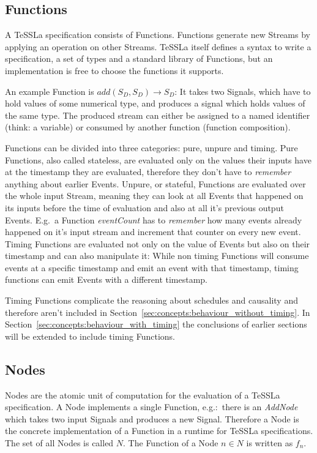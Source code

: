 \subsection{Functions}
\label{sec:concepts:defs:functions}

A TeSSLa specification consists of Functions.
Functions generate new Streams by applying an operation on other Streams.
TeSSLa itself defines a syntax to write a specification, a set of types and a standard library of Functions, but an implementation is free to choose the functions it supports.

An example Function is \(add(S_D,S_D) \rightarrow S_D\): It takes two Signals, which have to hold values of some numerical type, and produces a signal which holds values of the same type.
The produced stream can either be assigned to a named identifier (think: a variable) or consumed by another function (function composition).

Functions can be divided into three categories: pure, unpure and timing.
Pure Functions, also called stateless, are evaluated only on the values their inputs have at the timestamp they are evaluated, therefore they don't have to \emph{remember} anything about earlier Events.
Unpure, or stateful, Functions are evaluated over the whole input Stream, meaning they can look at all Events that happened on its inputs before the time of evaluation and also at all it's previous output Events.
E.g.\ a Function \emph{eventCount} has to \emph{remember} how many events already happened on it's input stream and increment that counter on every new event.
Timing Functions are evaluated not only on the value of Events but also on their timestamp and can also manipulate it:
While non timing Functions will consume events at a specific timestamp and emit an event with that timestamp, timing functions can emit Events with a different timestamp.

Timing Functions complicate the reasoning about schedules and causality and therefore aren't included in Section~\ref{sec:concepts:behaviour_without_timing}.
In Section~\ref{sec:concepts:behaviour_with_timing} the conclusions of earlier sections will be extended to include timing Functions.


\subsection{Nodes}
\label{sec:concepts:defs:nodes}

Nodes are the atomic unit of computation for the evaluation of a TeSSLa specification.
A Node implements a single Function, e.g.:\ there is an \emph{AddNode} which takes two input Signals and produces a new Signal.
Therefore a Node is the concrete implementation of a Function in a runtime for TeSSLa specifications.
The set of all Nodes is called \(N\).
The Function of a Node \(n \in N\) is written as \(f_n\).

